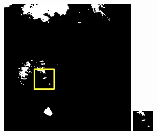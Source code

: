\documentclass[UTF8]{ctexart}
\begin{document}
\begin{figure}[H]
{\begin{minipage}[b]{0.15\linewidth}
            \vspace{4pt}
            \includegraphics[width=1\linewidth]{../log/cut/LC81620432014072LGN00_16101_my.jpg}\vspace{4pt}
            \includegraphics[width=1\linewidth]{../log/cut/tmp_cut_LC81620432014072LGN00_16101_my.jpg}

\end{minipage}}
\end{figure}
\end{document}
